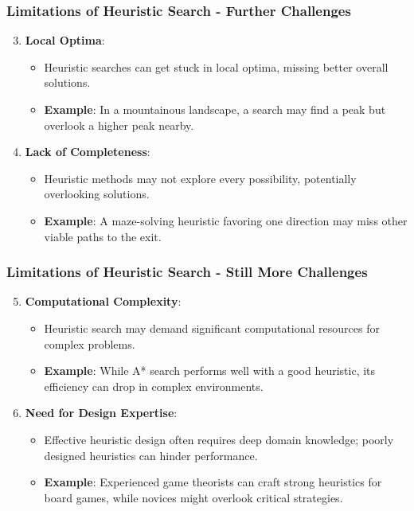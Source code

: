 \documentclass[aspectratio=169]{beamer}
\begin{document}
\begin{frame}[fragile]
    \frametitle{Limitations of Heuristic Search - Further Challenges}
    \begin{enumerate}
        \setcounter{enumi}{2} %
        \item \textbf{Local Optima}:
        \begin{itemize}
            \item Heuristic searches can get stuck in local optima, missing better overall solutions.
            \item \textbf{Example}: In a mountainous landscape, a search may find a peak but overlook a higher peak nearby.
        \end{itemize}

        \item \textbf{Lack of Completeness}:
        \begin{itemize}
            \item Heuristic methods may not explore every possibility, potentially overlooking solutions.
            \item \textbf{Example}: A maze-solving heuristic favoring one direction may miss other viable paths to the exit.
        \end{itemize}
    \end{enumerate}
\end{frame}

\begin{frame}[fragile]
    \frametitle{Limitations of Heuristic Search - Still More Challenges}
    \begin{enumerate}
        \setcounter{enumi}{4} %
        \item \textbf{Computational Complexity}:
        \begin{itemize}
            \item Heuristic search may demand significant computational resources for complex problems.
            \item \textbf{Example}: While A* search performs well with a good heuristic, its efficiency can drop in complex environments.
        \end{itemize}
        
        \item \textbf{Need for Design Expertise}:
        \begin{itemize}
            \item Effective heuristic design often requires deep domain knowledge; poorly designed heuristics can hinder performance.
            \item \textbf{Example}: Experienced game theorists can craft strong heuristics for board games, while novices might overlook critical strategies.
        \end{itemize}
    \end{enumerate}
\end{frame}
\end{document}
